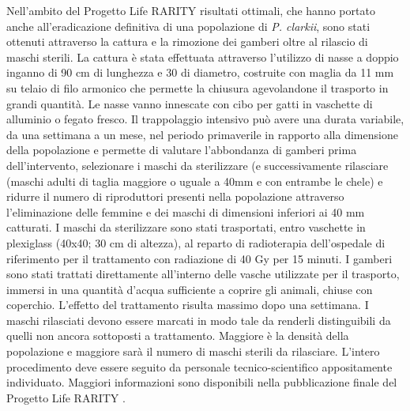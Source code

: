 \documentclass[11pt,a4paper,italian,twoside,openany]{memoir}
\begin{document}
Nell'ambito del Progetto Life RARITY risultati ottimali, che hanno portato anche all'eradicazione definitiva di una popolazione di \emph{P. clarkii}, sono stati ottenuti attraverso la cattura e la rimozione dei gamberi oltre al rilascio di maschi sterili. La cattura è stata effettuata attraverso l'utilizzo di nasse a doppio inganno di 90 cm di lunghezza e 30 di diametro, costruite con maglia da 11 mm su telaio di filo armonico che permette la chiusura agevolandone il trasporto in grandi quantità. Le nasse vanno innescate con cibo per gatti in vaschette di alluminio o fegato fresco. Il trappolaggio intensivo può avere una durata variabile, da una settimana a un mese, nel periodo primaverile in rapporto alla dimensione della popolazione e permette di valutare l'abbondanza di gamberi prima dell'intervento, selezionare i maschi da sterilizzare (e successivamente rilasciare (maschi adulti di taglia maggiore o uguale a 40mm e con entrambe le chele) e ridurre il numero di riproduttori presenti nella popolazione attraverso l'eliminazione delle femmine e dei maschi di dimensioni inferiori ai 40 mm catturati. I maschi da sterilizzare sono stati trasportati, entro vaschette in plexiglass (40x40; 30 cm di altezza), al reparto di radioterapia dell'ospedale di riferimento per il trattamento con radiazione di 40 Gy per 15 minuti. I gamberi sono stati trattati direttamente all'interno delle vasche utilizzate per il trasporto, immersi in una quantità d'acqua sufficiente a coprire gli animali, chiuse con coperchio. L'effetto del trattamento risulta massimo dopo una settimana. I maschi rilasciati devono essere marcati in modo tale da renderli distinguibili da quelli non ancora sottoposti a trattamento. Maggiore è la densità della popolazione e maggiore sarà il numero di maschi sterili da rilasciare. L'intero procedimento deve essere seguito da personale tecnico-scientifico appositamente individuato. Maggiori informazioni sono disponibili nella pubblicazione finale del Progetto Life RARITY \cite{Zanetti 2014b}.
\end{document}
